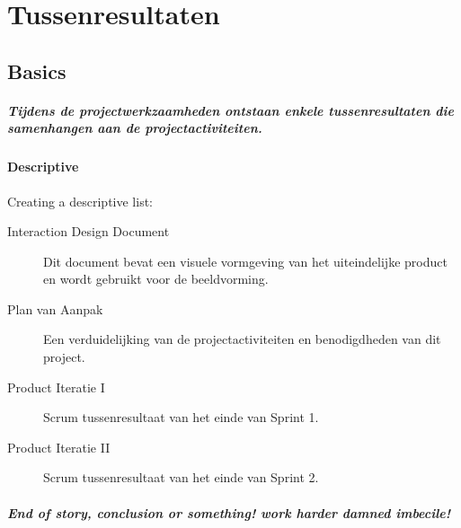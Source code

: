 \chapter{Tussenresultaten}


\section{Basics} \label{sec:basics}
\paragraph{Tijdens de projectwerkzaamheden ontstaan enkele tussenresultaten die samenhangen aan de projectactiviteiten. }

\subsubsection{Descriptive}
Creating a descriptive list:
\begin{description}
  \item[Interaction Design Document] Dit document bevat een visuele vormgeving van het uiteindelijke product en wordt gebruikt voor de beeldvorming.
  \item[Plan van Aanpak] Een verduidelijking van de projectactiviteiten en benodigdheden van dit project.
  \item[Product Iteratie I] Scrum tussenresultaat van het einde van Sprint 1.
  \item[Product Iteratie II] Scrum tussenresultaat van het einde van Sprint 2.
\end{description}


\paragraph{End of story, conclusion or something! work harder damned imbecile!}